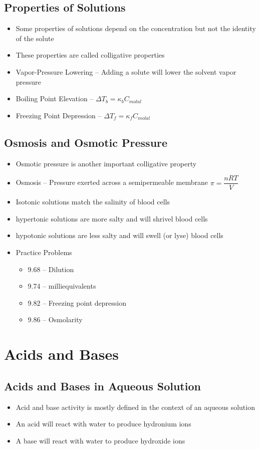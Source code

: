 \documentclass[12pt, openany, letterpaper]{memoir}
\begin{document}
\section{Properties of Solutions}
\begin{itemize}
	\item Some properties of solutions depend on the concentration but not the identity of the solute
	\item These properties are called colligative properties
	\item Vapor-Pressure Lowering -- Adding a solute will lower the solvent vapor pressure
	\item Boiling Point Elevation -- $\Delta T_b = \kappa_b C_{molal}$
	\item Freezing Point Depression -- $\Delta T_f = \kappa_f C_{molal}$
\end{itemize}
\section{Osmosis and Osmotic Pressure}
\begin{itemize}
	\item Osmotic pressure is another important colligative property
	\item Osmosis -- Pressure exerted across a semipermeable membrane $\pi = \dfrac{nRT}{V}$
	\item Isotonic solutions match the salinity of blood cells
	\item hypertonic solutions are more salty and will shrivel blood cells
	\item hypotonic solutions are less salty and will swell (or lyse) blood cells
	\item Practice Problems
	\begin{itemize}
		\item 9.68 -- Dilution
		\item 9.74 -- milliequivalents
		\item 9.82 -- Freezing point depression
		\item 9.86 -- Osmolarity
	\end{itemize}
\end{itemize}

\chapter{Acids and Bases}
\section{Acids and Bases in Aqueous Solution}
\begin{itemize}
	\item Acid and base activity is mostly defined in the context of an aqueous solution
	\item An acid will react with water to produce hydronium ions
	\item A base will react with water to produce hydroxide ions
\end{itemize}	
\end{document}
